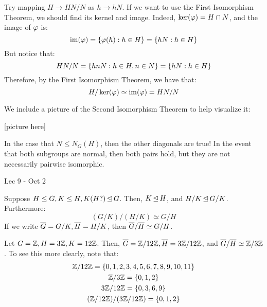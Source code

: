\begin{pf}[source=Primary Source Material]
    Try mapping $ H \rightarrow HN/N $ as $ h \rightarrow hN $.
    If we want to use the First Isomorphism Theorem, we should find its kernel and image.
    Indeed, $ \ker(\operatorname{\varphi}) = H \cap N $, and the image of $ \operatorname{\varphi} $ is:
    \begin{equation*}
        \operatorname{im}(\operatorname{\varphi}) = \left\{{\operatorname{\varphi}(h) : h \in H}\right\} = \left\{{hN : h \in H}\right\}
    \end{equation*}
    But notice that:
    \begin{equation*}
        HN/N = \left\{{hnN : h \in H, n \in N}\right\} = \left\{{hN : h \in H}\right\}
    \end{equation*}
    Therefore, by the First Isomorphism Theorem, we have that:
    \begin{equation*}
        H/\ker(\operatorname{\varphi}) \simeq \operatorname{im}(\operatorname{\varphi}) = HN/N
    \end{equation*}
\end{pf}
\newpage

We include a picture of the Second Isomorphism Theorem to help visualize it:

[picture here]

In the case that $ N \leq N_{G}(H) $, then the other diagonals are true!
In the event that both subgroups are normal, then both pairs hold,
but they are not necessarily pairwise isomorphic.

Lec 9 - Oct 2

\begin{thm}[title=Third Isomorphism Theorem]
    Suppose $ H \leq G, K \leq H, K(H?) \operatorname{\trianglelefteq} G $.
    Then, $ K \operatorname{\trianglelefteq} H $, and $ H/K \operatorname{\trianglelefteq} G/K $.
    Furthermore:
    \begin{equation*}
        (G/K) / (H/K) \simeq G/H
    \end{equation*}
    If we write $ \overline{G} = G/K, \overline{H} = H/K $, then $ \overline{G}/\overline{H} \simeq G/H $.
\end{thm}

\begin{xmp}[source=Primary Source Material]
    Let $ G = \mathbb{Z}, H = 3\mathbb{Z}, K = 12\mathbb{Z} $.
    Then, $ \overline{G} = \mathbb{Z}/12\mathbb{Z}, \overline{H} = 3\mathbb{Z}/12\mathbb{Z} $,
    and $ \overline{G}/\overline{H} \simeq \mathbb{Z}/3\mathbb{Z} $. \vsp
    To see this more clearly, note that:
    \begin{gather*}
        \mathbb{Z}/12\mathbb{Z} = \left\{{0, 1, 2, 3, 4, 5, 6, 7, 8, 9, 10, 11}\right\} \\
        \mathbb{Z}/3\mathbb{Z} = \left\{{0, 1, 2}\right\} \\
        3\mathbb{Z}/12\mathbb{Z} = \left\{{0, 3, 6, 9}\right\} \\
        (\mathbb{Z}/12\mathbb{Z})/(3\mathbb{Z}/12\mathbb{Z}) = \left\{{0, 1, 2}\right\}
    \end{gather*}
\end{xmp}

